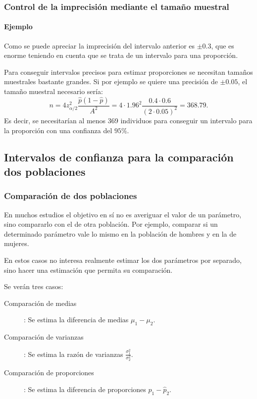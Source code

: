 \begin{frame}
\frametitle{Control de la imprecisión mediante el tamaño muestral}
\framesubtitle{Ejemplo}
Como se puede apreciar la imprecisión del intervalo anterior es $\pm 0.3$, que es enorme teniendo en cuenta que se trata de un intervalo para una proporción.

Para conseguir intervalos precisos para estimar proporciones se necesitan tamaños muestrales bastante grandes.
Si por ejemplo se quiere una precisión de $\pm 0.05$, el tamaño muestral necesario sería:
\[
n= 4 z_{\alpha/2}^2\frac{\hat{p}(1-\hat{p})}{A^2}=4\cdot 1.96^2\frac{0.4\cdot 0.6}{(2\cdot0.05)^2}= 368.79.
\]
Es decir, se necesitarían al menos 369 individuos para conseguir un intervalo para la proporción con una confianza del $95\%$.
\end{frame}


\subsection{Intervalos de confianza para la comparación dos poblaciones}
\begin{frame}
\frametitle{Comparación de dos poblaciones}
En muchos estudios el objetivo en sí no es averiguar el valor de un parámetro, sino compararlo con el de otra población.
Por ejemplo, comparar si un determinado parámetro vale lo mismo en la población de hombres y en la de mujeres.

En estos casos no interesa realmente estimar los dos parámetros por separado, sino hacer una estimación que permita su comparación.

Se verán tres casos:
\begin{description}
\item[Comparación de medias]: Se estima la diferencia de medias $\mu_1-\mu_2$.
\item[Comparación de varianzas]: Se estima la razón de varianzas $\displaystyle \frac{\sigma^2_1}{\sigma^2_2}$.
\item[Comparación de proporciones]: Se estima la diferencia de proporciones $\hat p_1-\hat p_2$.
\end{description}   
\end{frame}


